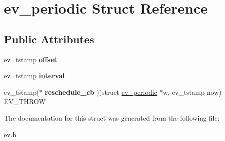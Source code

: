 \hypertarget{structev__periodic}{}\section{ev\+\_\+periodic Struct Reference}
\label{structev__periodic}
\subsection*{Public Attributes}
\begin{DoxyCompactItemize}
\item 
\hypertarget{structev__periodic_ae7fca8b8ce6fbccc41372d7bf12813e6}{}\label{structev__periodic_ae7fca8b8ce6fbccc41372d7bf12813e6} 
ev\+\_\+tstamp {\bfseries offset}
\item 
\hypertarget{structev__periodic_a84e353461763d37229b4a7028ed852aa}{}\label{structev__periodic_a84e353461763d37229b4a7028ed852aa} 
ev\+\_\+tstamp {\bfseries interval}
\item 
\hypertarget{structev__periodic_a2485c7ae4650ce0376fd3b24e71e37f7}{}\label{structev__periodic_a2485c7ae4650ce0376fd3b24e71e37f7} 
ev\+\_\+tstamp($\ast$ {\bfseries reschedule\+\_\+cb} )(struct \hyperlink{structev__periodic}{ev\+\_\+periodic} $\ast$w, ev\+\_\+tstamp now) E\+V\+\_\+\+T\+H\+R\+OW
\end{DoxyCompactItemize}


The documentation for this struct was generated from the following file\+:\begin{DoxyCompactItemize}
\item 
ev.\+h\end{DoxyCompactItemize}
